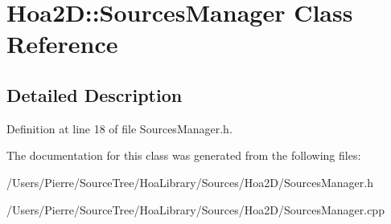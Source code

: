 \hypertarget{class_hoa2_d_1_1_sources_manager}{\section{Hoa2\-D\-:\-:Sources\-Manager Class Reference}
\label{class_hoa2_d_1_1_sources_manager}
}


\subsection{Detailed Description}


Definition at line 18 of file Sources\-Manager.\-h.



The documentation for this class was generated from the following files\-:\begin{DoxyCompactItemize}
\item 
/\-Users/\-Pierre/\-Source\-Tree/\-Hoa\-Library/\-Sources/\-Hoa2\-D/Sources\-Manager.\-h\item 
/\-Users/\-Pierre/\-Source\-Tree/\-Hoa\-Library/\-Sources/\-Hoa2\-D/Sources\-Manager.\-cpp\end{DoxyCompactItemize}
